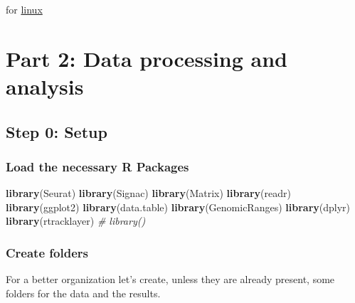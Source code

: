 \documentclass[]{article}
\newenvironment{Shaded}{\begin{snugshade}}{\end{snugshade}}
\newcommand{\BuiltInTok}[1]{#1}
\newcommand{\CommentTok}[1]{\textcolor[rgb]{0.56,0.35,0.01}{\textit{#1}}}
\newcommand{\ExtensionTok}[1]{#1}
\newcommand{\KeywordTok}[1]{\textcolor[rgb]{0.13,0.29,0.53}{\textbf{#1}}}
\newcommand{\NormalTok}[1]{#1}
\newcommand{\StringTok}[1]{\textcolor[rgb]{0.31,0.60,0.02}{#1}}
\newcommand{\VariableTok}[1]{\textcolor[rgb]{0.00,0.00,0.00}{#1}}
\begin{document}
for
\href{https://github.com/Maiolino-Au/ProgrAppBioinfo_Exam/blob/main/Docker_container/script_unix_maiolino_exam2025.sh}{linux}

\begin{Shaded}
\end{Shaded}

\newpage

\hypertarget{part-2-data-processing-and-analysis}{%
\section{Part 2: Data processing and
analysis}\label{part-2-data-processing-and-analysis}}

\hypertarget{step-0-setup}{%
\subsection{Step 0: Setup}\label{step-0-setup}}

\hypertarget{load-the-necessary-r-packages}{%
\subsubsection{Load the necessary R
Packages}\label{load-the-necessary-r-packages}}

\begin{Shaded}
\begin{Highlighting}[]
\KeywordTok{library}\NormalTok{(Seurat)}
\KeywordTok{library}\NormalTok{(Signac)}
\KeywordTok{library}\NormalTok{(Matrix)}
\KeywordTok{library}\NormalTok{(readr)}
\KeywordTok{library}\NormalTok{(ggplot2)}
\KeywordTok{library}\NormalTok{(data.table)}
\KeywordTok{library}\NormalTok{(GenomicRanges)}
\KeywordTok{library}\NormalTok{(dplyr)}
\KeywordTok{library}\NormalTok{(rtracklayer)}
\CommentTok{# library()}
\end{Highlighting}
\end{Shaded}

\hypertarget{create-folders}{%
\subsubsection{Create folders}\label{create-folders}}

For a better organization let's create, unless they are already present,
some folders for the data and the results.
\end{document}

